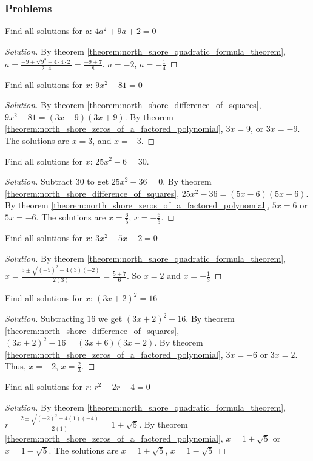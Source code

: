 \documentclass[../main.tex]{subfiles}
\begin{document}
\subsubsection{Problems}
%
\begin{problem}
Find all solutions for a: $4a^2 + 9a + 2 = 0$
\end{problem}
\begin{proof}[Solution]
By theorem \ref{theorem:north_shore_quadratic_formula_theorem}, $a = \frac{-9 \pm \sqrt{9^2 - 4\cdot 4 \cdot 2}}{2\cdot 4} = \frac{-9 \pm 7}{8}$. $a=-2$, $a=-\frac{1}{4}$
\end{proof}
%
\begin{problem}
Find all solutions for $x$: $9x^2 - 81 = 0$
\end{problem}
\begin{proof}[Solution]
By theorem \ref{theorem:north_shore_difference_of_squares}, $9x^2-81 = (3x - 9)(3x+9)$. By theorem \ref{theorem:north_shore_zeros_of_a_factored_polynomial}, $3x = 9$, or $3x = -9$. The solutions are $x = 3$, and $x= -3$.
\end{proof}
%
\begin{problem}
Find all solutions for $x$: $25x^2 - 6 = 30$.
\end{problem}
\begin{proof}[Solution]
Subtract $30$ to get $25x^2 - 36 = 0$. By theorem \ref{theorem:north_shore_difference_of_squares}, $25x^2-36 =(5x - 6)(5x+6)$. By theorem \ref{theorem:north_shore_zeros_of_a_factored_polynomial}, $5x = 6$ or $5x = -6$. The solutions are $x = \frac{6}{5}$, $x=-\frac{6}{5}$.
\end{proof}
%
\begin{problem}
Find all solutions for $x$: $3x^2 - 5x - 2 = 0$
\end{problem}
\begin{proof}[Solution]
By theorem \ref{theorem:north_shore_quadratic_formula_theorem}, $x = \frac{5 \pm \sqrt{(-5)^2 - 4(3)(-2)}}{2(3)} = \frac{5 \pm 7}{6}$. So $x = 2$ and $x = -\frac{1}{3}$
\end{proof}
%
\begin{problem}
Find all solutions for $x$: $(3x+2)^2 = 16$
\end{problem}
\begin{proof}[Solution]
Subtracting $16$ we get $(3x+2)^2 - 16$. By theorem \ref{theorem:north_shore_difference_of_squares}, $(3x+2)^2-16 = (3x+6)(3x-2)$. By theorem \ref{theorem:north_shore_zeros_of_a_factored_polynomial}, $3x = -6$ or $3x = 2$. Thus, $x = -2$, $x = \frac{2}{3}$.
\end{proof}
%
\begin{problem}
Find all solutions for $r$: $r^2 - 2r - 4 = 0$
\end{problem}
\begin{proof}[Solution]
By theorem \ref{theorem:north_shore_quadratic_formula_theorem}, $r = \frac{2 \pm \sqrt{(-2)^2 - 4(1)(-4)}}{2(1)} =  1\pm \sqrt{5}$. By theorem \ref{theorem:north_shore_zeros_of_a_factored_polynomial}, $x = 1+\sqrt{5}$ or $x=1-\sqrt{5}$. The solutions are $x = 1+\sqrt{5}$, $x=1-\sqrt{5}$
\end{proof}
%
\end{document}
